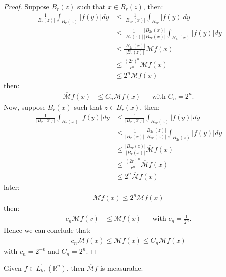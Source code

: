 \begin{proof} 
  Suppose $B_r(z)$ such that $x\in B_{r}(z)$, then:
  \begin{align*}
    \frac{1}{|B_{r}(z)|}\int_{B_{r}(z)}|f(y)|dy&\leq \frac{1}{|B_{2r}(x)|}\int_{B_{2r}}^{}|f(y)|dy\\
    &\leq \frac{1}{|B_{r}(z)|}\frac{|B_{2r}(x)|}{|B_{2r}(x)|}\int_{B_{2r}(x)}|f(y)|dy\\
    &\leq \frac{|B_{2r}(x)|}{|B_{r}(z)|}\mathcal{M}f(x)\\
    &\leq \frac{(2r)^n}{r^n}\mathcal{M}f(x)\\
    &\leq 2^n\mathcal{M}f(x)
  \end{align*}
  then:
  \begin{align*}
    \overline{\mathcal{M}}f(x)&\leq C_n\mathcal{M}f(x) &&\text{with $C_n=2^n$.}
  \end{align*}
  Now, suppose $B_r(x)$ such that $z\in B_r(x)$, then:
  \begin{align*}
    \frac{1}{|B_r(x)|}\int_{B_{r}(x)}|f(y)|dy&\leq \frac{1}{|B_{r}(x)|}\int_{B_{2r}(z)}|f(y)|dy\\
    &\leq \frac{1}{|B_{r}(x)|}\frac{|B_{2r}(z)|}{|B_{2r}(z)|}\int_{B_{2r}(z)}|f(y)|dy\\
    &\leq \frac{|B_{2r}(z)|}{|B_{r}(x)|}\overline{\mathcal{M}}f(x)\\
    &\leq \frac{(2r)^n}{r^n}\overline{\mathcal{M}}f(x)\\
    &\leq 2^n\overline{\mathcal{M}}f(x)
  \end{align*}
  later:
  \begin{align*}
    \mathcal{M}f(x)\leq 2^n\overline{\mathcal{M}}f(x)
  \end{align*}
  then:
  \begin{align*}
    c_n\mathcal{M}f(x)&\leq \overline{\mathcal{M}}f(x) &&\text{with $c_n=\frac{1}{2^n}$.}
  \end{align*}
  Hence we can conclude that:
  \begin{align*}
    c_n\mathcal{M}f(x)\leq \overline{\mathcal{M}}f(x)\leq C_n\mathcal{M}f(x)
  \end{align*}
  with $c_n=2^{-n}$ and $C_n=2^n$. 
\end{proof}

\begin{proposition}{}
  Given $f\in L^{1}_{loc}(\mathbb{R}^{n})$, then $\overline{\mathcal{M}}f$ is measurable. 
\end{proposition}

